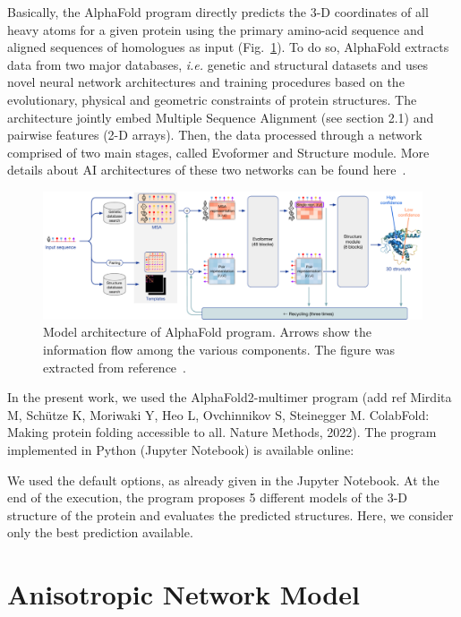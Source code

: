 Basically, the AlphaFold program directly predicts the 3-D coordinates of all heavy atoms for a given protein using the primary amino-acid sequence and aligned sequences of homologues as input (Fig.~\ref{FIG1}). To do so, AlphaFold extracts data from two major databases, \textit{i.e.} genetic and structural datasets and uses novel neural network architectures and training procedures based on the evolutionary, physical and geometric constraints of protein structures. The architecture jointly embed Multiple Sequence Alignment (see section 2.1) and pairwise features (2-D arrays). Then, the data processed through a network comprised of two main stages, called Evoformer and Structure module. More details about AI architectures of these two networks can be found here~\cite{AlphaFold}.

\begin{figure}[h!]
	\includegraphics[width=16cm]{../figures/figure_AF_scheme.pdf}
	\caption{Model architecture of AlphaFold program. Arrows show the information flow among the various components. The figure was extracted from reference~\cite{AlphaFold}.}
	\label{FIG1}
\end{figure}

In the present work, we used the AlphaFold2-multimer program (add ref Mirdita M, Schütze K, Moriwaki Y, Heo L, Ovchinnikov S, Steinegger M. ColabFold: Making protein folding accessible to all. Nature Methods, 2022). The program implemented in Python (Jupyter Notebook) is available online:
\vspace{-1cm}
\begin{center}
\end{center}

We used the default options, as already given in the Jupyter Notebook. At the end of the execution, the program proposes 5 different models of the 3-D structure of the protein and evaluates the predicted structures. Here, we consider only the best prediction available.

\section{Anisotropic Network Model}

